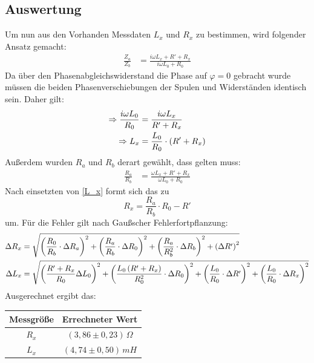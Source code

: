 \subsection{Auswertung}
Um nun aus den Vorhanden Messdaten \(L_x\) und \(R_x\) zu bestimmen, wird folgender Ansatz gemacht:
\begin{align}
\frac{Z_a}{Z_b} &= \frac{i\omega L_x + R'+ R_x}{i\omega L_0 + R_0}
\end{align}
Da über den Phasenabgleichswiderstand die Phase auf \(\varphi = 0\) gebracht wurde müssen die beiden Phasenverschiebungen der Spulen und Widerständen identisch sein. Daher gilt:
\begin{align}
\Rightarrow \frac{i\omega L_0}{R_0} &= \frac{i\omega L_x}{R'+R_x}\notag \\
\Rightarrow L_x &= \frac{L_0}{R_0}\cdot\left( R' + R_x \right) \label{L_x}
\end{align}
Außerdem wurden \(R_a\) und \(R_b\) derart gewählt, dass gelten muss:
\begin{align}
\frac{R_a}{R_b} &= \frac{\omega L_x + R' + R_x}{\omega L_0 + R_0}
\end{align}
Nach einsetzten von \eqref{L_x} formt sich das zu
\begin{equation}
R_x = \frac{R_a}{R_b} \cdot R_0 - R'
\end{equation} um.
Für die Fehler gilt nach Gaußscher Fehlerfortpflanzung:
\begin{align}
\Delta R_x &= \sqrt{
\left( \frac{R_0}{R_b} \cdot \Delta R_a \right)^2 +
\left( \frac{R_a}{R_b} \cdot \Delta R_0 \right)^2 +
\left( \frac{R_a}{R_b^2} \cdot \Delta R_b \right)^2 +
\left( \Delta R' \right)^2
}\notag \\
\Delta L_x &= \sqrt{
\left( \frac{R'+R_x}{R_0} \Delta L_0 \right)^2 +
\left( \frac{L_0\left( R'+R_x \right)}{R_0^2}  \cdot \Delta R_0 \right)^2 +
\left( \frac{L_0}{R_0} \cdot \Delta R' \right)^2 +
\left( \frac{L_0}{R_0} \cdot \Delta R_x \right)^2
}\notag
\end{align}
Ausgerechnet ergibt das:
\begin{center}
\begin{tabular}{c|c}
Messgröße & Errechneter Wert\\\hline
\(R_x\) & \(\left(3,86 \pm 0,23 \right)\, \Omega \) \\
\(L_x\) & \((4,74\pm 0,50)\, mH \) \\
\end{tabular}
\end{center}

